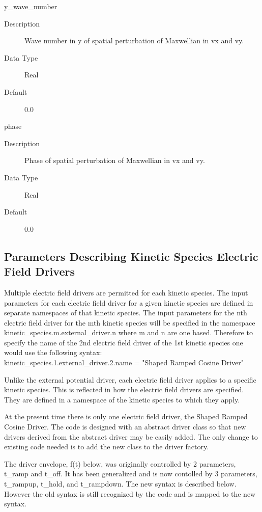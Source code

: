 \documentclass[11pt]{amsart}
\begin{document}
y\_wave\_number
\begin{description}
\item [Description] Wave number in y of spatial perturbation of Maxwellian in
vx and vy.
\item [Data Type] Real
\item [Default] 0.0
\end{description}

phase
\begin{description}
\item [Description] Phase of spatial perturbation of Maxwellian in vx and vy.
\item [Data Type] Real
\item [Default] 0.0
\end{description}

\subsection*{Parameters Describing Kinetic Species Electric Field Drivers}
Multiple electric field drivers are permitted for each kinetic species.  The
input parameters for each electric field driver for a given kinetic species are
defined in separate namespaces of that kinetic species.  The input parameters
for the nth electric field driver for the mth kinetic species will be specified
in the namespace kinetic\_species.m.external\_driver.n where m and n are one
based.  Therefore to specify the name of the 2nd electric field driver of the
1st kinetic species one would use the following syntax: \\
kinetic\_species.1.external\_driver.2.name = "Shaped Ramped Cosine Driver"

Unlike the external potential driver, each electric field driver applies to a
specific kinetic species.  This is reflected in how the electric field drivers
are specified.  They are defined in a namespace of the kinetic species to which
they apply.

At the present time there is only one electric field driver, the Shaped Ramped
Cosine Driver.  The code is designed with an abstract driver class so that
new drivers derived from the abstract driver may be easily added.  The only
change to existing code needed is to add the new class to the driver factory.

The driver envelope, f(t) below, was originally controlled by 2 parameters,
t\_ramp and t\_off.  It has been generalized and is now contolled by 3
parameters, t\_rampup, t\_hold, and t\_rampdown.  The new syntax is described
below.  However the old syntax is still recognized by the code and is mapped to
the new syntax.
\end{document}
